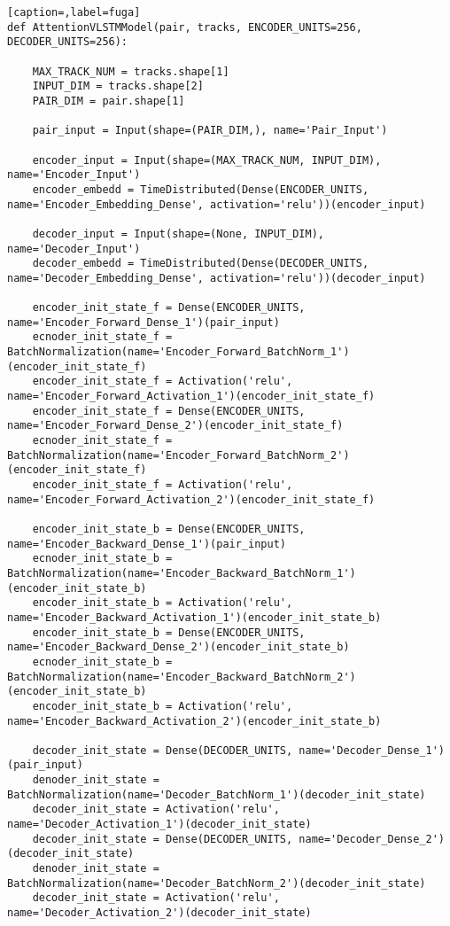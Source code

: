 \begin{lstlisting}[caption=,label=fuga]
def AttentionVLSTMModel(pair, tracks, ENCODER_UNITS=256, DECODER_UNITS=256):

    MAX_TRACK_NUM = tracks.shape[1]
    INPUT_DIM = tracks.shape[2]
    PAIR_DIM = pair.shape[1]

    pair_input = Input(shape=(PAIR_DIM,), name='Pair_Input')

    encoder_input = Input(shape=(MAX_TRACK_NUM, INPUT_DIM), name='Encoder_Input')
    encoder_embedd = TimeDistributed(Dense(ENCODER_UNITS, name='Encoder_Embedding_Dense', activation='relu'))(encoder_input)

    decoder_input = Input(shape=(None, INPUT_DIM), name='Decoder_Input')
    decoder_embedd = TimeDistributed(Dense(DECODER_UNITS, name='Decoder_Embedding_Dense', activation='relu'))(decoder_input)

    encoder_init_state_f = Dense(ENCODER_UNITS, name='Encoder_Forward_Dense_1')(pair_input)
    ecnoder_init_state_f = BatchNormalization(name='Encoder_Forward_BatchNorm_1')(encoder_init_state_f)
    encoder_init_state_f = Activation('relu', name='Encoder_Forward_Activation_1')(encoder_init_state_f)
    encoder_init_state_f = Dense(ENCODER_UNITS, name='Encoder_Forward_Dense_2')(encoder_init_state_f)
    ecnoder_init_state_f = BatchNormalization(name='Encoder_Forward_BatchNorm_2')(encoder_init_state_f)
    encoder_init_state_f = Activation('relu', name='Encoder_Forward_Activation_2')(encoder_init_state_f)

    encoder_init_state_b = Dense(ENCODER_UNITS, name='Encoder_Backward_Dense_1')(pair_input)
    ecnoder_init_state_b = BatchNormalization(name='Encoder_Backward_BatchNorm_1')(encoder_init_state_b)
    encoder_init_state_b = Activation('relu', name='Encoder_Backward_Activation_1')(encoder_init_state_b)
    encoder_init_state_b = Dense(ENCODER_UNITS, name='Encoder_Backward_Dense_2')(encoder_init_state_b)
    ecnoder_init_state_b = BatchNormalization(name='Encoder_Backward_BatchNorm_2')(encoder_init_state_b)
    encoder_init_state_b = Activation('relu', name='Encoder_Backward_Activation_2')(encoder_init_state_b)

    decoder_init_state = Dense(DECODER_UNITS, name='Decoder_Dense_1')(pair_input)
    denoder_init_state = BatchNormalization(name='Decoder_BatchNorm_1')(decoder_init_state)
    decoder_init_state = Activation('relu', name='Decoder_Activation_1')(decoder_init_state)
    decoder_init_state = Dense(DECODER_UNITS, name='Decoder_Dense_2')(decoder_init_state)
    denoder_init_state = BatchNormalization(name='Decoder_BatchNorm_2')(decoder_init_state)
    decoder_init_state = Activation('relu', name='Decoder_Activation_2')(decoder_init_state)


\end{lstlisting}
